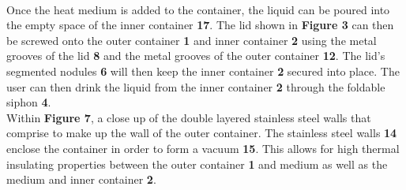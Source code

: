 \documentclass[english]{uspatent}
\begin{document}
\\
\hspace*{0.5cm} Once the heat medium is added to the container, the liquid can be poured into the empty space of the inner container \textbf{17}. The lid shown in \textbf{Figure 3} can then be screwed onto the outer container \textbf{1} and inner container \textbf{2} using the metal grooves of the lid \textbf{8} and the metal grooves of the outer container \textbf{12}. The lid's segmented nodules \textbf{6} will then keep the inner container \textbf{2} secured into place. The user can then drink the liquid from the inner container \textbf{2} through the foldable siphon \textbf{4}. 
\\
\hspace*{0.5cm} Within \textbf{Figure 7}, a close up of the double layered stainless steel walls that comprise to make up the wall of the outer container. The stainless steel walls \textbf{14} enclose the container in order to form a vacuum \textbf{15}. This allows for high thermal insulating properties between the outer container \textbf{1} and medium as well as the medium and inner container \textbf{2}.
\end{document}
